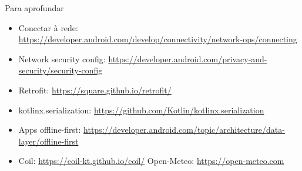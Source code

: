 \documentclass[aspectratio=169,10pt]{beamer}
\begin{document}
\begin{frame}{Para aprofundar}
  \small
  \begin{itemize}
    \item Conectar à rede: \url{https://developer.android.com/develop/connectivity/network-ops/connecting}
    \item Network security config: \url{https://developer.android.com/privacy-and-security/security-config}
    \item Retrofit: \url{https://square.github.io/retrofit/}
    \item kotlinx.serialization: \url{https://github.com/Kotlin/kotlinx.serialization}
    \item Apps offline-first: \url{https://developer.android.com/topic/architecture/data-layer/offline-first}
    \item Coil: \url{https://coil-kt.github.io/coil/} \quad Open-Meteo: \url{https://open-meteo.com}
  \end{itemize}
\end{frame}

\end{document}
